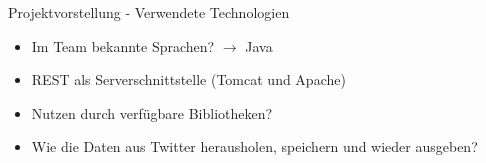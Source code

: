 \begin{frame}{Projektvorstellung - Verwendete Technologien}
    \begin{itemize}
        \item Im Team bekannte Sprachen? $\rightarrow$ Java
        \item REST als Serverschnittstelle (Tomcat und Apache)
        \item Nutzen durch verfügbare Bibliotheken?
        \item Wie die Daten aus Twitter herausholen, speichern und wieder ausgeben?
    \end{itemize}
\end{frame}
